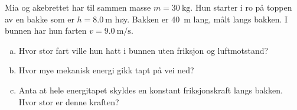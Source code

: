 %
Mia og akebrettet har til sammen masse $m = \SI{30}{\kilo\gram}$. Hun starter i ro på toppen av en bakke som er $h = \SI{8.0}{\metre}$ høy. Bakken er \SI{40}{\metre} lang, målt langs bakken. I bunnen har hun farten $v = \SI{9.0}{\metre\per\second}$.
\begin{enumerate}[a)]
    \item Hvor stor fart ville hun hatt i bunnen uten friksjon og luftmotstand?
    \item Hvor mye mekanisk energi gikk tapt på vei ned?
    \item Anta at hele energitapet skyldes en konstant friksjonskraft langs bakken. Hvor stor er denne kraften?
\end{enumerate}
